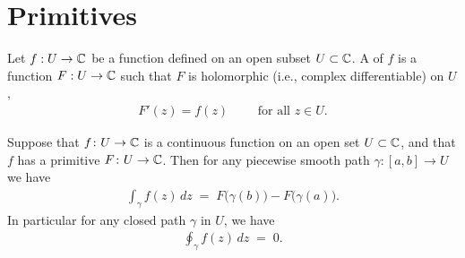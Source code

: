 \section{Primitives}

\begin{definition}
  \label{def:primitive}
  Let $f : U \to \mathbb{C}$ be a function defined on an open subset $U \subset \mathbb{C}$.
  A  of $f$ is a function $F : U \to \mathbb{C}$ such that
  $F$ is holomorphic (i.e., complex differentiable) on $U$,
  \begin{align*}
    F'(z) = f(z) \qquad \text{ for all } z \in U .
  \end{align*}
\end{definition}

\begin{theorem}
  \label{thm:ftc_for_contour_integrals}
  Suppose that $f \colon U \to \mathbb{C}$ is a continuous function
  on an open set $U \subset \mathbb{C}$, and that $f$ has a
  primitive $F \colon U \to \mathbb{C}$.
  Then for any piecewise smooth path $\gamma \colon [a,b] \to U$ we have
  \begin{align*}
    \int_\gamma f(z) \, dz \; = \; F \big( \gamma(b) \big) - F \big( \gamma(a) \big) .
  \end{align*}
  In particular for any closed path $\gamma$ in $U$, we have
  \begin{align*}
    \oint_\gamma f(z) \, dz \; = \; 0 .
  \end{align*}
\end{theorem}
